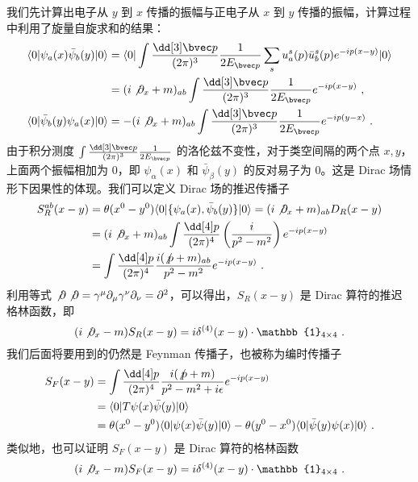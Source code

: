 
我们先计算出电子从 $y$ 到 $x$ 传播的振幅与正电子从 $x$ 到 $y$ 传播的振幅，计算过程中利用了旋量自旋求和的结果：
\begin{equation}
\begin{aligned}
\langle 0 | \psi_a(x) \bar\psi_b(y)|0\rangle &= \langle 0|\int \frac{\dd[3] \bvec p}{(2\pi)^3} \frac{1}{2E_{\bvec p}}\sum_s u^s_a(p)\bar u^s_b(p) e^{-ip(x-y)} |0\rangle\\
&=(i\not \partial_x+m)_{ab}\int \frac{\dd[3] \bvec p}{(2\pi)^3}\frac{1}{2E_{\bvec p}}e^{-ip(x-y)}~,\\
\langle 0 | \bar\psi_b(y) \psi_a(x)|0\rangle &=-(i\not\partial_x +m)_{ab}\int \frac{\dd[3] \bvec p}{(2\pi)^3}\frac{1}{2E_{\bvec p}}e^{-ip(y-x)}~.
\end{aligned}
\end{equation}
由于积分测度 $\int \frac{\dd[3]\bvec  p}{(2\pi)^3}\frac{1}{2E_{\bvec p}}$ 的洛伦兹不变性，对于类空间隔的两个点 $x,y$，上面两个振幅相加为 $0$，即 $\psi_\alpha(x)$ 和 $\bar\psi_\beta(y)$ 的反对易子为 $0$。这是 Dirac 场情形下因果性的体现。我们可以定义 Dirac 场的推迟传播子
\begin{equation}
\begin{aligned}
S^{ab}_R(x-y)&=\theta(x^0-y^0) \langle 0| \{\psi_a(x),\bar\psi_b(y) \} | 0\rangle = (i\not \partial_x+m)_{ab} D_R(x-y)\\
&=(i\not\partial_x+m)_{ab}\int \frac{\dd[4] p}{(2\pi)^4}\left(\frac{i}{p^2-m^2}\right)e^{-ip(x-y)}\\
&=\int \frac{\dd[4] p}{(2\pi)^4}\frac{i(\not p+m)_{ab}}{p^2-m^2}e^{-ip(x-y)}~.
\end{aligned}
\end{equation}
利用等式 $\not \partial \not \partial=\gamma^\mu\partial_\mu\gamma^\nu\partial_\nu=\partial^2$，可以得出，$S_R(x-y)$ 是 Dirac 算符的推迟格林函数，即
\[
(i\not \partial_x-m)S_R(x-y) = i\delta^{(4)}(x-y) \cdot \mathbb{1}_{4\times 4}~.
\]
我们后面将要用到的仍然是 Feynman 传播子，也被称为编时传播子
\begin{equation}
\begin{aligned}
S_F(x-y)&=\int \frac{\dd[4] p}{(2\pi)^4}\frac{i(\not p+m)}{p^2-m^2+i\epsilon}e^{-ip(x-y)}\\
\notag&=\langle 0|T\psi(x)\bar\psi(y)|0\rangle \\
\notag&=\theta(x^0-y^0) \langle 0|\psi(x)\bar\psi(y) |0\rangle -\theta(y^0-x^0)\langle 0|\bar\psi(y)\psi(x)|0\rangle~.
\end{aligned}
\end{equation}
类似地，也可以证明 $S_F(x-y)$ 是 Dirac 算符的格林函数
\[
(i\not \partial_x-m)S_F(x-y) = i\delta^{(4)}(x-y) \cdot \mathbb{1}_{4\times 4}~.
\]